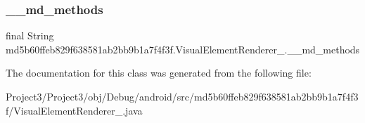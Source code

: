 \subsubsection{\texorpdfstring{\+\_\+\+\_\+md\+\_\+methods}{\_\_md\_methods}}
{\footnotesize\ttfamily final String md5b60ffeb829f638581ab2bb9b1a7f4f3f.\+Visual\+Element\+Renderer\+\_.\+\_\+\+\_\+md\+\_\+methods\hspace{0.3cm}{\ttfamily [static]}}



The documentation for this class was generated from the following file\+:\begin{DoxyCompactItemize}
\item 
Project3/\+Project3/obj/\+Debug/android/src/md5b60ffeb829f638581ab2bb9b1a7f4f3f/Visual\+Element\+Renderer\+\_.\+java\end{DoxyCompactItemize}
